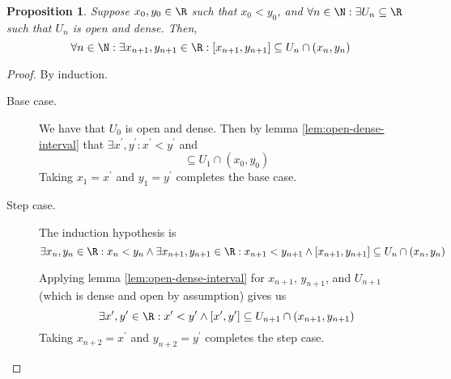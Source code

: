 \documentclass[letterpaper,11pt]{article}
\newtheorem{prop}{Proposition}
\newcommand{\intersn}{\cap}
\begin{document}
\begin{prop}
  Suppose $x_0, y_0 \in \R$ such that $x_0 < y_0$, and
  $\forall n \in \N: \exists U_n \subseteq \R$ such that $U_n$ is open and
  dense.
  Then,
  \begin{equation*}
    \forall n \in \N: \exists x_{n+1}, y_{n+1} \in \R:
    [x_{n+1}, y_{n+1}] \subseteq U_n \intersn (x_n, y_n)
  \end{equation*}
\end{prop}

\begin{proof}
  By induction.
  \begin{description}
    \item[Base case.]
      We have that $U_0$ is open and dense.
      Then by lemma
      \ref{lem:open-dense-interval}
      that $\exists x^\prime, y^\prime : x^\prime < y^\prime$
      and
      \begin{equation*}
        [x^\prime, y^\prime] \subseteq U_1 \intersn (x_0, y_0)
      \end{equation*}
      Taking $x_1 = x^\prime$ and $y_1 = y^\prime$ completes the base case.

    \item[Step case.]
      The induction hypothesis is
      \begin{equation*}
        \exists x_n, y_n \in \R: x_n < y_n
        \land
        \exists x_{n+1}, y_{n+1} \in \R: x_{n+1} < y_{n+1}
        \land
        [x_{n+1}, y_{n+1}] \subseteq U_n \intersn (x_n, y_n)
      \end{equation*}

      Applying lemma \ref{lem:open-dense-interval} for $x_{n+1}$, $y_{n+1}$,
      and $U_{n+1}$ (which is dense and open by assumption) gives us
      \begin{equation*}
        \exists x^\prime, y^\prime \in \R: x^\prime < y^\prime
        \land
        [x^\prime, y^\prime] \subseteq U_{n+1} \intersn (x_{n+1}, y_{n+1})
      \end{equation*}
      Taking $x_{n+2} = x^\prime$ and $y_{n+2} = y^\prime$ completes the step
      case.
  \end{description}
\end{proof}
\end{document}
